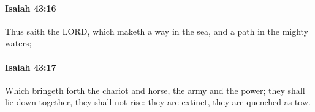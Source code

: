 		\paragraph{Isaiah 43:16} %
			\label{ISAIAH-43-16}

			Thus saith the LORD, which maketh a way in the sea, and a path in the mighty waters;


		\paragraph{Isaiah 43:17} %
			\label{ISAIAH-43-17}

			Which bringeth forth the chariot and horse, the army and the power; they shall lie down together, they shall not rise: they are extinct, they are quenched as tow.


